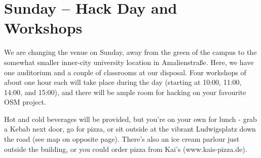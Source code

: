 \ClearWallPaper

\cropmarkswallpaper

\newpage
{}
\thispagestyle{empty}
\section*{Sunday -- Hack Day and Workshops}

We are changing the venue on Sunday, away from the green of
the campus to the somewhat smaller inner-city university
location in Amalienstraße. Here, we have one auditorium and a
couple of classrooms at our disposal. Four workshops of about
one hour each will take place during the day (starting at 10:00,
11:00, 14:00, and 15:00), and there will be ample room for
hacking on your favourite OSM project.

Hot and cold beverages will be provided, but you're on your own
for lunch - grab a Kebab next door, go for pizza, or sit outside at
the vibrant Ludwigsplatz down the road (see map on opposite
page). There's also an ice cream parlour just outside the
building, or you could order pizza from Kai's (www.kais-pizza.de).
\cropmarkswallpaper
